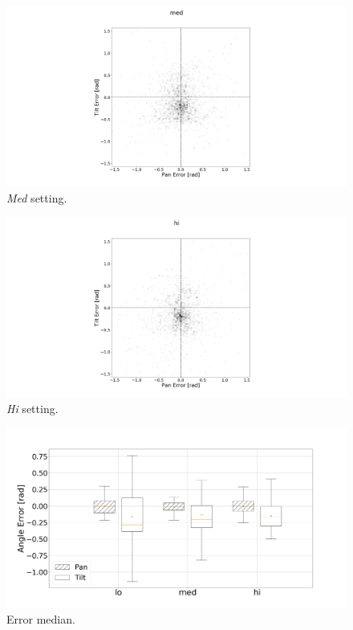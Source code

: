 \documentclass[sigconf, screen=true, anonymous=true]{acmart}
\begin{document}
\begin{figure}
  \centering
  \includegraphics[clip, trim=450 0 450 110, width=0.8\columnwidth]{figures/err_med.png}
  \caption{\emph{Med} setting. }\label{fig:err-results-med}
\end{figure}

\begin{figure}
  \centering
  \includegraphics[clip, trim=450 0 450 110, width=0.8\columnwidth]{figures/err_hi.png}
  \caption{\emph{Hi} setting. }\label{fig:err-results-hi}
\end{figure}

\begin{figure}
  \centering
  \includegraphics[clip, trim=20 -70 100 100, width=0.8\columnwidth]{figures/err_boxplot_medians.png}
  \caption{Error median.}\label{fig:err-boxplot-median}
\end{figure}
\end{document}
